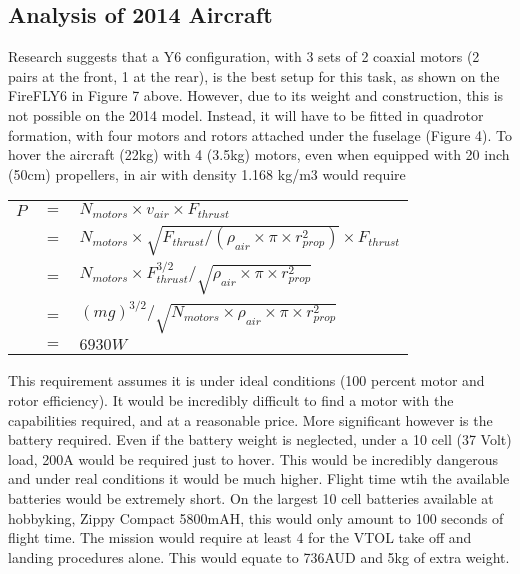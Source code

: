 \label{sec:AppA}

\subsection{Analysis of 2014 Aircraft}
\label{sec:lastYear}
Research suggests that a Y6 configuration, with 3 sets of 2 coaxial motors (2 pairs at the front, 1 at the rear), is the best setup for this task, as shown on the FireFLY6 in Figure 7 above. However, due to its weight and construction, this is not possible on the 2014 model. Instead, it will have to be fitted in quadrotor formation, with four motors and rotors attached under the fuselage (Figure 4). To hover the aircraft (22kg) with 4 (3.5kg) motors, even when equipped with 20 inch (50cm) propellers, in air with density 1.168 kg/m3 would require\\

\begin{tabular}{r c l}
	$P$ & $=$ & $N_{motors} \times v_{air} \times F_{thrust}$\\
	& $=$ & $N_{motors} \times \sqrt{F_{thrust}/(\rho_{air} \times \pi \times r_{prop}^2)} \times F_{thrust}$\\
	& $=$ & $N_{motors} \times F_{thrust}^{3/2}/\sqrt{\rho_{air} \times \pi \times r_{prop}^2}$\\
	& $=$ & $(mg)^{3/2}/\sqrt{N_{motors} \times \rho_{air} \times \pi \times r_{prop}^2}$\\
	& $=$ & $6930W$\\
\end{tabular}
\vspace{6pt}
	
This requirement assumes it is under ideal conditions (100 percent motor and rotor efficiency). It would be incredibly difficult to find a motor with the capabilities required, and at a reasonable price.
More significant however is the battery required. Even if the battery weight is neglected, under a 10 cell (37 Volt) load, 200A would be required just to hover. This would be incredibly dangerous and under real conditions it would be much higher. Flight time wtih the available batteries would be extremely short. On the largest 10 cell batteries available at hobbyking, Zippy Compact 5800mAH, this would only amount to 100 seconds of flight time. The mission would require at least 4 for the VTOL take off and landing procedures alone. This would equate to 736AUD and 5kg of extra weight.

